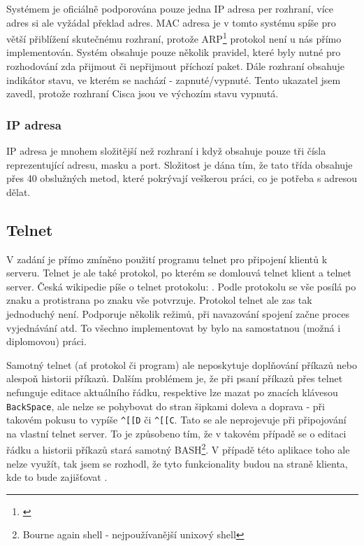 Systémem je oficiálně podporována pouze jedna IP adresa per rozhraní, více adres si ale vyžádal překlad adres. MAC adresa je v tomto systému spíše pro větší přiblížení skutečnému rozhraní, protože ARP\footnote{\cite{wiki:arp}} protokol není u nás přímo implementován. Systém obsahuje pouze několik pravidel, které byly nutné pro rozhodování zda přijmout či nepřijmout příchozí paket. Dále rozhraní obsahuje indikátor stavu, ve kterém se nachází - zapnuté/vypnuté. Tento ukazatel jsem zavedl, protože rozhraní Cisca jsou ve výchozím stavu vypnutá.

\subsubsection{IP adresa}
IP adresa je mnohem složitější než rozhraní i když obsahuje pouze tři čísla reprezentující adresu, masku a port. Složitost je dána tím, že tato třída obsahuje přes 40 obslužných metod, které pokrývají veškerou práci, co je potřeba s adresou dělat.


\subsection{Telnet}
V zadání je přímo zmíněno použití programu telnet pro připojení klientů k serveru. Telnet je ale také protokol, po kterém se domlouvá telnet klient a telnet server. Česká wikipedie píše o telnet protokolu: . Podle protokolu se vše posílá po znaku a protistrana po znaku vše potvrzuje. Protokol telnet ale zas tak jednoduchý není. Podporuje několik režimů, při navazování spojení začne proces vyjednávání atd. To všechno implementovat by bylo na samostatnou (možná i diplomovou) práci. 

Samotný telnet (ať protokol či program) ale neposkytuje doplňování příkazů nebo alespoň historii příkazů. Dalším problémem je, že při psaní příkazů přes telnet nefunguje editace aktuálního řádku, respektive lze mazat po znacích klávesou \verb|BackSpace|, ale nelze se pohybovat do stran šipkami doleva a doprava - při takovém pokusu to vypíše \verb|^[[D| či \verb|^[[C|. Tato  se ale neprojevuje při připojování na vlastní telnet server. To je způsobeno tím, že v takovém případě se o editaci řádku a historii příkazů stará samotný BASH\footnote{Bourne again shell - nejpoužívanější unixový shell}. V případě této aplikace toho ale nelze využít, tak jsem se rozhodl, že tyto funkcionality budou na straně klienta, kde to bude zajišťovat . 

